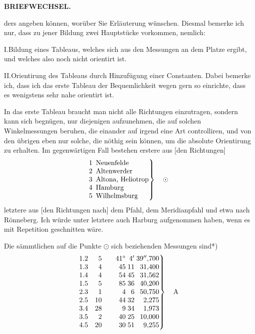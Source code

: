 \par\clearpage
\noindent{}\hfill{\small\textbf{BRIEFWECHSEL.}}\hfill\null\par\medskip

\noindent ders angeben können, worüber Sie Erläuterung wünschen. Diesmal bemerke ich nur, dass zu jener Bildung zwei Hauptstücke vorkommen, nemlich:

I.\quad Bildung eines Tableaus, welches sich  aus den Messungen an dem Platze ergibt, und welches also noch nicht orientirt ist.

II.\quad Orientirung des Tableaus durch Hinzufügung einer Constanten. Dabei bemerke ich, dass ich das erste Tableau der Bequemlichkeit wegen gern so einrichte, dass es wenigstens sehr nahe orientirt ist.

In das erste Tableau braucht man nicht alle Richtungen einzutragen, sondern kann sich begnügen, nur diejenigen aufzunehmen, die auf solchen Winkelmessungen beruhen, die einander auf irgend eine Art controlliren, und von den übrigen eben nur solche, die nöthig sein können, um die absolute Orientirung zu erhalten. Im gegenwärtigen Fall bestehen erstere aus [den Richtungen]
\[
\left.
\begin{array}{@{}r@{\enspace}l@{}}
 1&\text{Neuenfelde}\\
 2&\text{Altenwerder}\\
 3&\text{Altona, Heliotrop}\\
 4&\text{Hamburg}\\
 5&\text{Wilhelmsburg}
\end{array}
\right\}\quad\odot
\]
letztere aus [den Richtungen nach] dem Pfahl, dem Meridianpfahl und etwa nach Rönneberg. Ich würde unter letztere auch Harburg aufgenommen haben, wenn es mit Repetition geschnitten wäre.

Die sämmtlichen auf die Punkte \(\odot\) sich beziehenden Messungen sind*)
\[
\left.
\begin{array}{@{}r@{\quad}r@{\qquad}r@{\;}r@{\;}r@{}}
 1.2&5&41^\circ&4'&39''{,}700\\
 1.3&4&45&11&31{,}400\\
 1.4&4&54&45&31{,}562\\
 1.5&5&85&36&40{,}200\\
 2.3&1&4&6&50{,}750\\
 2.5&10&44&32&2{,}275\\
 3.4&28&9&34&1{,}973\\
 3.5&2&40&25&10{,}000\\
 4.5&20&30&51&9{,}255
\end{array}
\right\}\quad\mathrm{A}
\]

